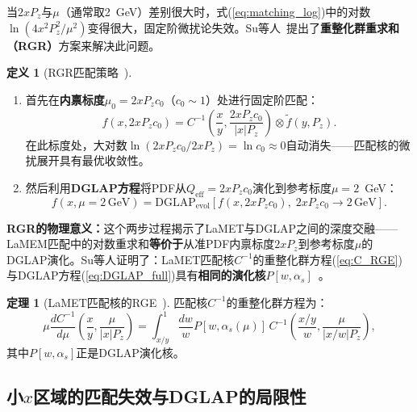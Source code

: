 \documentclass[12pt,a4paper]{ctexart}
\theoremstyle{definition}
\newtheorem{definition}{定义}[section]
\newtheorem{theorem}{定理}[section]
\begin{document}
当$2xP_z$与$\mu$（通常取2~GeV）差别很大时，式(\ref{eq:matching_log})中的对数$\ln(4x^2 P_z^2/\mu^2)$变得很大，固定阶微扰论失效。Su等人~\cite{Su2023RGR}提出了\textbf{重整化群重求和（RGR）}方案来解决此问题。

\begin{definition}[RGR匹配策略~\cite{Su2023RGR}]
\begin{enumerate}[nosep]
    \item 首先在\textbf{内禀标度}$\mu_0 = 2xP_z c_0$（$c_0 \sim 1$）处进行固定阶匹配：
    \begin{equation}
    f(x, 2xP_z c_0) = C^{-1}\!\left(\frac{x}{y}, \frac{2xP_z c_0}{|x|P_z}\right) \otimes \tilde f(y, P_z).
    \label{eq:fixed_order_match}
    \end{equation}
    在此标度处，大对数$\ln(2xP_z c_0/2xP_z) = \ln c_0 \approx 0$自动消失——匹配核的微扰展开具有最优收敛性。

    \item 然后利用\textbf{DGLAP方程}将PDF从$Q_{\text{eff}} = 2xP_z c_0$演化到参考标度$\mu = 2$~GeV：
    \begin{equation}
    f(x, \mu = 2\,\text{GeV}) = \text{DGLAP}_{\text{evol}}\!\left[ f(x, 2xP_z c_0),\; 2xP_z c_0 \to 2\,\text{GeV} \right].
    \label{eq:DGLAP_evolve}
    \end{equation}
\end{enumerate}
\end{definition}

\textbf{RGR的物理意义：}这个两步过程揭示了LaMET与DGLAP之间的深度交融——LaMEM匹配中的对数重求和\textbf{等价于}从准PDF内禀标度$2xP_z$到参考标度$\mu$的DGLAP演化。Su等人证明了：LaMET匹配核$C^{-1}$的重整化群方程(\ref{eq:C_RGE})与DGLAP方程(\ref{eq:DGLAP_full})具有\textbf{相同的演化核}$P[w, \alpha_s]$~\cite{Su2023RGR}。

\begin{theorem}[LaMET匹配核的RGE~\cite{Su2023RGR}]
匹配核$C^{-1}$的重整化群方程为：
\begin{equation}
\mu \frac{d C^{-1}}{d\mu}\!\left(\frac{x}{y}, \frac{\mu}{|x|P_z}\right)
= \int_{x/y}^1 \frac{dw}{w} P[w, \alpha_s(\mu)] \, C^{-1}\!\left(\frac{x/y}{w}, \frac{\mu}{|x/w|P_z}\right),
\label{eq:C_RGE}
\end{equation}
其中$P[w, \alpha_s]$正是DGLAP演化核。
\end{theorem}

\subsection{小$x$区域的匹配失效与DGLAP的局限性}
\end{document}
